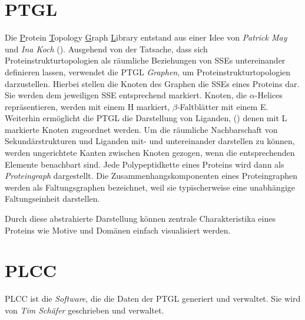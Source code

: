 \documentclass{report}
\begin{document}




\section{PTGL}


Die \underline{P}rotein \underline{T}opology \underline{G}raph \underline{L}ibrary entstand aus einer Idee von \textit{Patrick May} und \textit{Ina Koch} (\cite{ptgl1}). Ausgehend von der Tatsache, dass sich Proteinstrukturtopologien als r\"aumliche Beziehungen von SSEs untereinander definieren lassen, verwendet die PTGL \emph{Graphen}, um Proteinstrukturtopologien darzustellen.
Hierbei stellen die Knoten des Graphen die SSEs eines Proteins dar. Sie werden dem jeweiligen SSE entsprechend markiert. Knoten, die $\alpha$-Helices repr\"asentieren, werden mit einem H markiert, $\beta$-Faltbl\"atter mit einem E. Weiterhin erm\"oglicht die PTGL die Darstellung von Liganden, (\cite{vplg}) denen mit L markierte Knoten zugeordnet werden. Um die r\"aumliche Nachbarschaft von Sekund\"arstrukturen und Liganden mit- und untereinander darstellen zu k\"onnen, werden ungerichtete Kanten zwischen Knoten gezogen, wenn die entsprechenden Elemente benachbart sind. Jede Polypeptidkette eines Proteins wird dann als \emph{Proteingraph} dargestellt. Die Zusammenhangskomponenten eines Proteingraphen werden als Faltungsgraphen bezeichnet, weil sie typischerweise eine unabh\"angige Faltungseinheit darstellen.

Durch diese abstrahierte Darstellung k\"onnen zentrale Charakteristika eines Proteins wie Motive und Dom\"anen einfach visualisiert werden.


\section{PLCC}

PLCC ist die \textit{Software}, die die Daten der PTGL generiert und verwaltet. Sie wird von \textit{Tim Sch\"afer} geschrieben und verwaltet.
\end{document}
